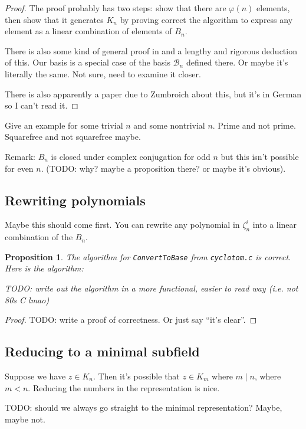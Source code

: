 \documentclass{article}
\newtheorem{prop}{Proposition}
\begin{document}
\begin{proof}
The proof probably has two steps: show that there are $\varphi(n)$
elements, then show that it generates $K_n$ by proving correct the
algorithm to express any element as a linear combination of elements
of $B_n$.

There is also some kind of general proof in \cite{Breuer1997} and a
lengthy and rigorous deduction of this. Our basis is a special case of
the basis $\mathcal{B}_n$ defined there. Or maybe it's literally the
same. Not sure, need to examine it closer.

There is also apparently a paper due to Zumbroich about this, but it's
in German so I can't read it.
\end{proof}

Give an example for some trivial $n$ and some nontrivial $n$. Prime
and not prime. Squarefree and not squarefree maybe.

Remark: $B_n$ is closed under complex conjugation for odd $n$ but this
isn't possible for even $n$. (TODO: why? maybe a proposition there? or
maybe it's obvious).

\subsection{Rewriting polynomials}

Maybe this should come first. You can rewrite any polynomial in
$\zeta_n^i$ into a linear combination of the $B_n$.

\begin{prop}
  The algorithm for {\tt ConvertToBase} from {\tt cyclotom.c} is
  correct. Here is the algorithm:

  TODO: write out the algorithm in a more functional, easier to read
  way (i.e. not 80s C lmao)
\end{prop}

\begin{proof}
TODO: write a proof of correctness. Or just say ``it's clear''.
\end{proof}

\subsection{Reducing to a minimal subfield}

Suppose we have $z \in K_n$. Then it's possible that $z \in K_m$ where
$m \mid n$, where $m < n$. Reducing the numbers in the representation
is nice.

TODO: should we always go straight to the minimal representation?
Maybe, maybe not.
\end{document}
